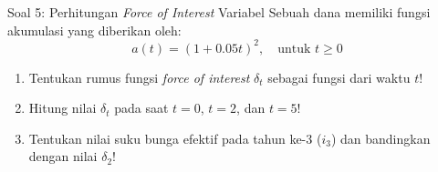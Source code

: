 \documentclass[11pt,a4paper]{article}
\begin{document}
\vspace{1.2em}

\begin{problembox}{Soal 5: Perhitungan \textit{Force of Interest} Variabel}
Sebuah dana memiliki fungsi akumulasi yang diberikan oleh:
\begin{equation*}
    a(t) = (1 + 0.05t)^2, \quad \text{untuk } t \ge 0
\end{equation*}
\begin{enumerate}[label=(\alph*)]
    \item Tentukan rumus fungsi \textit{force of interest} $\delta_t$ sebagai fungsi dari waktu $t$!
    \item Hitung nilai $\delta_t$ pada saat $t = 0$, $t = 2$, dan $t = 5$!
    \item Tentukan nilai suku bunga efektif pada tahun ke-3 ($i_3$) dan bandingkan dengan nilai $\delta_2$!
\end{enumerate}
\end{problembox}
\end{document}
